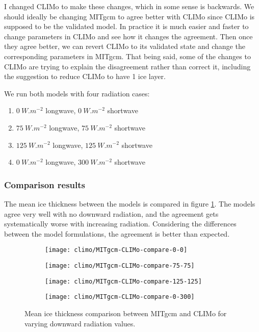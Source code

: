 \documentclass[11pt]{article}
\begin{document}
I changed CLIMo to make these changes, which in some sense is backwards. We should ideally be changing MITgcm to agree better with CLIMo since CLIMo is supposed to be the validated model. In practice it is much easier and faster to change parameters in CLIMo and see how it changes the agreement. Then once they agree better, we can revert CLIMo to its validated state and change the corresponding parameters in MITgcm. That being said, some of the changes to CLIMo are trying to explain the disagreement rather than correct it, including the suggestion to reduce CLIMo to have 1 ice layer.

We run both models with four radiation cases:
\begin{enumerate}
\item{$\SI{0}{W.m^{-2}}$ longwave, $\SI{0}{W.m^{-2}}$ shortwave}
\item{$\SI{75}{W.m^{-2}}$ longwave, $\SI{75}{W.m^{-2}}$ shortwave}
\item{$\SI{125}{W.m^{-2}}$ longwave, $\SI{125}{W.m^{-2}}$ shortwave}
\item{$\SI{0}{W.m^{-2}}$ longwave, $\SI{300}{W.m^{-2}}$ shortwave}
\end{enumerate}

\subsubsection{Comparison results}
The mean ice thickness between the models is compared in figure \ref{fig:CLIMoCompare}. The models agree very well with no downward radiation, and the agreement gets systematically worse with increasing radiation. Considering the differences between the model formulations, the agreement is better than expected.

\begin{figure}[h!]
\begin{subfigure}{0.475\linewidth}
\texttt{[image: climo/MITgcm-CLIMo-compare-0-0]}
\end{subfigure}
\begin{subfigure}{0.475\linewidth}
\texttt{[image: climo/MITgcm-CLIMo-compare-75-75]}
\end{subfigure}

\begin{subfigure}{0.475\linewidth}
\texttt{[image: climo/MITgcm-CLIMo-compare-125-125]}
\end{subfigure}
\begin{subfigure}{0.475\linewidth}
\texttt{[image: climo/MITgcm-CLIMo-compare-0-300]}
\end{subfigure}
\caption{Mean ice thickness comparison between MITgcm and CLIMo for varying downward radiation values.}
\label{fig:CLIMoCompare}
\end{figure}
\end{document}
